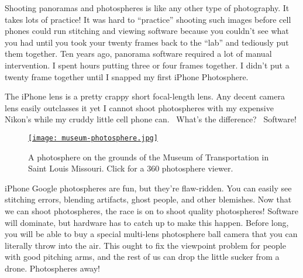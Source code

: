 


Shooting panoramas and photospheres is like any other type of
photography. It takes lots of practice! It was hard to ``practice''
shooting such images before cell phones could run stitching and viewing
software because you couldn't see what you had until you took your
twenty frames back to the ``lab'' and tediously put them together. Ten
years ago, panorama software required a lot of manual intervention. I
spent hours putting three or four frames together. I didn't put a twenty
frame together until I snapped my first iPhone Photosphere.

The iPhone lens is a pretty crappy short focal-length lens. Any decent
camera lens easily outclasses it yet I cannot shoot photospheres with my
expensive Nikon's while my cruddy little cell phone can.~ What's the
difference?~ Software!

\begin{figure}[htbp]
\centering
\href{https://www.google.com/maps/views/view/109459250977988268850/gphoto/6074254717471563618}{\texttt{[image: museum-photosphere.jpg]}}
\caption[Photosphere of the Museum of Transportation in Saint Louis]{A photosphere on the grounds of the Museum of Transportation in Saint Louis Missouri.
Click for a 360 photosphere viewer.}
\label{fig:4832X0}
\end{figure}





iPhone Google photospheres are fun, but they're flaw-ridden. You can
easily see stitching errors, blending artifacts, ghost people, and other
blemishes. Now that we can shoot photospheres, the race is on to shoot
quality photospheres! Software will dominate, but hardware has to catch
up to make this happen. Before long, you will be able to buy a special
multi-lens photosphere ball camera that you can literally throw into the
air. This ought to fix the viewpoint problem for people with good
pitching arms, and the rest of us can drop the little sucker from a
drone. Photospheres away!

